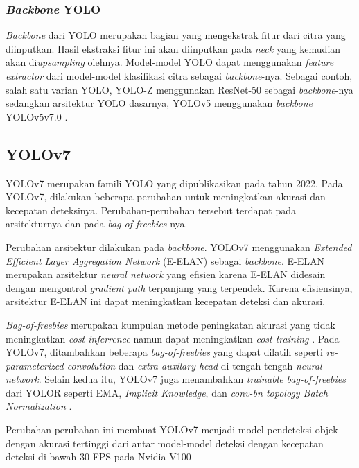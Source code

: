   \subsubsection{\emph{Backbone} YOLO}
    \emph{Backbone} dari YOLO merupakan bagian yang mengekstrak fitur dari citra yang diinputkan.
    Hasil ekstraksi fitur ini akan diinputkan pada \emph{neck} yang kemudian akan di\emph{upsampling} olehnya.
    Model-model YOLO dapat menggunakan \emph{feature extractor} dari model-model klasifikasi citra sebagai \emph{backbone}-nya.
    Sebagai contoh, salah satu varian YOLO, YOLO-Z menggunakan ResNet-50 sebagai \emph{backbone}-nya sedangkan arsitektur YOLO dasarnya, YOLOv5 menggunakan \emph{backbone} YOLOv5v7.0 \parencite{yoloz}.




\subsection{YOLOv7}
  YOLOv7 merupakan famili YOLO yang dipublikasikan pada tahun 2022.
  Pada YOLOv7, dilakukan beberapa perubahan untuk meningkatkan akurasi dan kecepatan deteksinya.
  Perubahan-perubahan tersebut terdapat pada arsitekturnya dan pada \emph{bag-of-freebies}-nya.

  Perubahan arsitektur dilakukan pada \emph{backbone}. YOLOv7 menggunakan \emph{Extended Efficient Layer Aggregation Network} (E-ELAN) sebagai \emph{backbone}.
  E-ELAN merupakan arsitektur \emph{neural network} yang efisien karena E-ELAN didesain dengan mengontrol \emph{gradient path} terpanjang yang terpendek.
  Karena efisiensinya, arsitektur E-ELAN ini dapat meningkatkan kecepatan deteksi dan akurasi. \parencite{yolov7}

  \emph{Bag-of-freebies} merupakan kumpulan metode peningkatan akurasi yang tidak meningkatkan \emph{cost inferrence} namun dapat meningkatkan \emph{cost training} \parencite{yolov4}. 
  Pada YOLOv7, ditambahkan beberapa \emph{bag-of-freebies} yang dapat dilatih seperti \emph{re-parameterized convolution} dan \emph{extra auxilary head} di tengah-tengah \emph{neural network}.
  Selain kedua itu, YOLOv7 juga menambahkan \emph{trainable bag-of-freebies} dari YOLOR seperti EMA, \emph{Implicit Knowledge}, dan \emph{conv-bn topology Batch Normalization} \parencite{yolov7}.

  Perubahan-perubahan ini membuat YOLOv7 menjadi model pendeteksi objek dengan akurasi tertinggi dari antar model-model deteksi dengan kecepatan deteksi di bawah 30 FPS pada Nvidia V100

